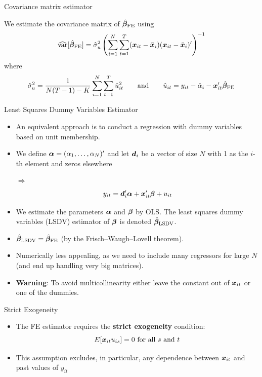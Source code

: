 \documentclass[english, professionalfonts,smaller,xcolor=dvipsnames]{beamer}
\begin{document}
\begin{frame}{Covariance matrix estimator}
    
We estimate the covariance matrix of $\hat{\bm \beta}_{\text{FE}}$ using
$$
\widehat{\operatorname{var}}[\hat{\bm \beta}_{\text{FE}}] = \hat\sigma_u^2 \left( \sum_{i=1}^N \sum_{t=1}^T (\bm x_{it} - \bar{\bm x}_i ) (\bm x_{it} - \bar{\bm x}_i )' \right)^{-1}
$$
where
\[
\hat\sigma_u^2 = \frac{1}{N(T-1)-K} \sum_{i=1}^N \sum_{t=1}^T \hat{u}_{it}^2
\qquad \text{and} \qquad \hat{u}_{it} = y_{it} - \hat\alpha_i - \bm x_{it}' \hat{\bm \beta}_{\text{FE}}
\]

\end{frame}

\begin{frame}{Least Squares Dummy Variables Estimator}
\begin{itemize}
\item An equivalent approach is to conduct a regression with dummy variables based on unit membership.
\item We define $\bm \alpha = (\alpha_1,\ldots,\alpha_N )'$ and let $\bm d_i$ be a vector of size $N$ with 1 as the $i$-th element and zeros elsewhere 

$\Rightarrow$
$$
y_{it} = \bm d_i'\bm \alpha + \bm x_{it}' \bm \beta + u_{it}
$$
\vspace*{-\baselineskip}
\item We estimate the parameters $\bm \alpha$ and $\bm \beta$ by OLS. The least squares dummy variables (LSDV) estimator of $\bm \beta$ is denoted $\hat{\bm \beta}_{\mathrm{LSDV}}$.
\item $\hat{\bm \beta}_{\mathrm{LSDV}} = \hat{\bm \beta}_{\mathrm{FE}}$ (by the Frisch--Waugh--Lovell theorem).
\item Numerically less appealing, as we need to include many regressors for large $N$ (and end up handling very big matrices).
\item \textbf{Warning}: To avoid multicollinearity either leave the constant out of $\bm x_{it}$ or one of the dummies. 
\end{itemize}
\end{frame}

\begin{frame}{Strict Exogeneity}
\begin{itemize}
\item The FE estimator requires the \textbf{strict exogeneity} condition:
$$
E[\bm x_{it} u_{is}] = 0 \text{ for all~$s$ and~$t$}
$$
\item This assumption excludes, in particular, any dependence between $\bm x_{it}$ and past values of $y_{it}$
\end{itemize}
\end{frame}
\end{document}
